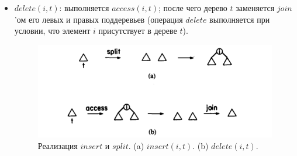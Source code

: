 \documentclass[a4paper,11pt]{article}
\begin{document}
\begin{itemize}
    \item \(delete(i, t)\): выполняется \(access(i, t)\); после чего дерево \(t\) заменяется \(join\)'ом его левых и правых поддеревьев (операция \(delete\) выполняется при условии, что элемент \(i\) присутствует в дереве \(t\)).

    \begin{figure}[h] \centering
        \includegraphics[scale=.5]{img/update2.png}
        \caption{Реализация \(insert\) и \(split\). (a) \(insert(i, t)\). (b) \(delete(i, t)\).}
        \label{fig:update2}
    \end{figure}
    

    
\end{itemize}
\end{document}
